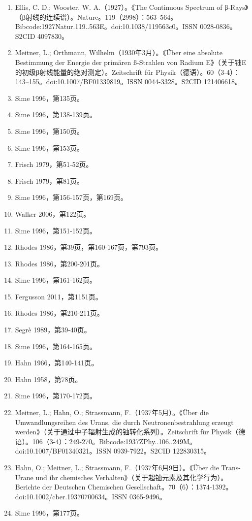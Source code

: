 \begin{enumerate}
\item Ellis, C. D.; Wooster, W. A.（1927）。《The Continuous Spectrum of β-Rays》（β射线的连续谱）。Nature。119（2998）：563–564。Bibcode:1927Natur.119..563E。doi:10.1038/119563c0。ISSN 0028-0836。S2CID 4097830。
\item Meitner, L.; Orthmann, Wilhelm（1930年3月）。《Über eine absolute Bestimmung der Energie der primären ß-Strahlen von Radium E》（关于铀E的初级β射线能量的绝对测定）。Zeitschrift für Physik（德语）。60（3-4）：143–155。doi:10.1007/BF01339819。ISSN 0044-3328。S2CID 121406618。
\item Sime 1996，第135页。
\item Sime 1996，第138-139页。
\item Sime 1996，第150页。
\item Sime 1996，第153页。
\item Frisch 1979，第51-52页。
\item Frisch 1979，第81页。
\item Sime 1996，第156-157页，第169页。
\item Walker 2006，第122页。
\item Sime 1996，第151-152页。
\item Rhodes 1986，第39页，第160-167页，第793页。
\item Rhodes 1986，第200-201页。
\item Sime 1996，第161-162页。
\item Fergusson 2011，第1151页。
\item Rhodes 1986，第210-211页。
\item Segrè 1989，第39-40页。
\item Sime 1996，第164-165页。
\item Hahn 1966，第140-141页。
\item Hahn 1958，第78页。
\item Sime 1996，第170-172页。
\item Meitner, L.; Hahn, O.; Strassmann, F.（1937年5月）。《Über die Umwandlungsreihen des Urans, die durch Neutronenbestrahlung erzeugt werden》（关于通过中子辐射生成的铀转化系列）。Zeitschrift für Physik（德语）。106（3-4）：249-270。Bibcode:1937ZPhy..106..249M。doi:10.1007/BF01340321。ISSN 0939-7922。S2CID 122830315。
\item Hahn, O.; Meitner, L.; Strassmann, F.（1937年6月9日）。《Über die Trans-Urane und ihr chemisches Verhalten》（关于超铀元素及其化学行为）。Berichte der Deutschen Chemischen Gesellschaft。70（6）：1374-1392。doi:10.1002/cber.19370700634。ISSN 0365-9496。
\item Sime 1996，第177页。

\end{enumerate}

